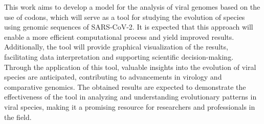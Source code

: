 This work aims to develop a model for the analysis of viral genomes based on the use of codons, which will serve as a tool for studying the evolution of species using genomic sequences of SARS-CoV-2. It is expected that this approach will enable a more efficient computational process and yield improved results. Additionally, the tool will provide graphical visualization of the results, facilitating data interpretation and supporting scientific decision-making. Through the application of this tool, valuable insights into the evolution of viral species are anticipated, contributing to advancements in virology and comparative genomics. The obtained results are expected to demonstrate the effectiveness of the tool in analyzing and understanding evolutionary patterns in viral species, making it a promising resource for researchers and professionals in the field.

